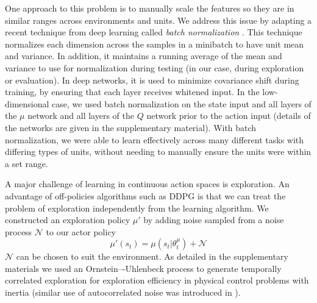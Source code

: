 \documentclass{article} %
\begin{document}
One approach to
this problem is to manually scale the features so they are in similar
ranges across environments and units.
We address this issue by adapting a recent
technique from deep learning called \emph{batch normalization}
\citep{ioffe2015batch}. This technique normalizes each dimension
across the samples in a minibatch to have unit mean and variance.
In addition, it maintains a running average of the mean and variance to
use for normalization during testing
(in our case, during exploration or evaluation).
In deep networks, it is used to minimize covariance shift during training,
by ensuring that each layer receives whitened input.
In the low-dimensional case, we used batch
normalization on the state input and all layers of the  $\mu$
network and all layers of the $Q$ network prior to the action input
(details of the networks are given in the supplementary material).
With batch normalization, we were able
to learn effectively across many different tasks with differing types
of units, without needing to manually ensure the units were within a
set range.

A major challenge of learning in continuous action spaces is exploration.
An advantage of off-policies algorithms such
as DDPG is that we can treat the problem of exploration independently
from the learning algorithm. We constructed an exploration policy
$\mu'$ by adding noise
sampled from a noise process $\mathcal{N}$ to our actor policy
\begin{equation}
  \mu'(s_t) = \mu(s_t | \theta^\mu_t) + \mathcal{N}
\end{equation}
$\mathcal{N}$ can be chosen to suit the environment.  As
detailed in the supplementary materials we used an Ornstein–-Uhlenbeck
process \citep{uhlenbeck1930theory} to generate temporally correlated
exploration for exploration efficiency in physical control problems
with inertia (similar use of autocorrelated noise was introduced in
\citep{wawrzynski2015control}).
\end{document}
